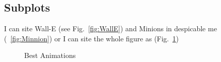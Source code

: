 \clearpage
\begin{landscape}
\section*{Subplots}
I can site Wall-E (see Fig.~\ref{fig:WallE}) and Minions in despicable me (~\ref{fig:Minnion}) or I can site the whole figure as (Fig.~\ref{fig:animations})

 
\begin{figure}
  \centering
  \caption{Best Animations}
  \label{fig:animations}
\end{figure}
\end{landscape}
